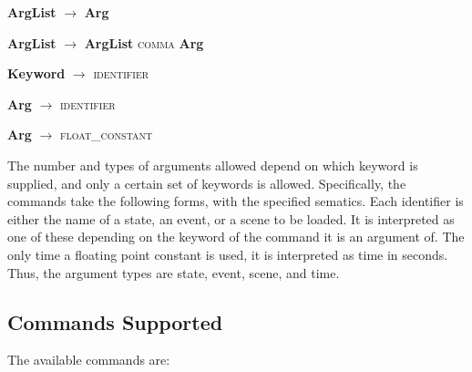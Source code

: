 \documentclass[letter,12pt]{article}
\begin{document}
\textbf{ArgList} $\rightarrow$ \textbf{Arg}

\textbf{ArgList} $\rightarrow$ \textbf{ArgList} \textsc{comma} \textbf{Arg}

\textbf{Keyword} $\rightarrow$ \textsc{identifier}

\textbf{Arg} $\rightarrow$ \textsc{identifier}

\textbf{Arg} $\rightarrow$ \textsc{float\_constant}


The number and types of arguments allowed depend on which keyword is supplied, and only a certain set of keywords is allowed.  Specifically, the commands take the following forms, with the specified sematics.  Each identifier is either the name of a state, an event, or a scene to be loaded.  It is interpreted as one of these depending on the keyword of the command it is an argument of.  The only time a floating point constant is used, it is interpreted as time in seconds.  Thus, the argument types are state, event, scene, and time.   

\subsection{Commands Supported}

The available commands are:
\end{document}
